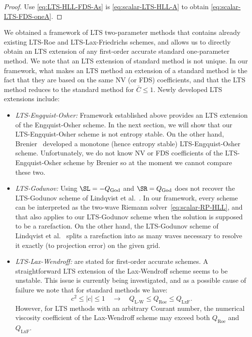 \begin{proof}
Use \eqref{eq:LTS-HLL-FDS-As} is \eqref{eq:scalar-LTS-HLL-A} to obtain \eqref{eq:scalar-LTS-FDS-oneA}.
\end{proof}

We obtained a framework of LTS two-parameter methods that contains already existing LTS-Roe and LTS-Lax-Friedrichs schemes, and allows us to directly obtain an LTS extension of any first-order accurate standard one-parameter method. We note that an LTS extension of standard method is not unique. In our framework, what makes an LTS method an extension of a standard method is the fact that they are based on the same NV (or FDS) coefficients, and that the LTS method reduces to the standard method for $ \bar{C} \leq 1 $. Newly developed LTS extensions include:
\begin{itemize} \label{eq:LTS-1p-itemize}
\item \textit{LTS-Engquist-Osher:} Framework established above provides an LTS extension of the Engquist-Osher scheme. In the next section, we will show that our LTS-Engquist-Osher scheme is not entropy stable. On the other hand, Brenier~\cite{bre84} developed a monotone (hence entropy stable) LTS-Engquist-Osher scheme. Unfortunately, we do not know NV or FDS coefficients of the LTS-Engquist-Osher scheme by Brenier so at the moment we cannot compare these two.

\item \textit{LTS-Godunov:} Using $ \SL=-Q_\text{God} $ and $ \SR=Q_\text{God} $ does not recover the LTS-Godunov scheme of Lindqvist et al.~\cite{lin16}. In our framework, every scheme can be interpreted as the two-wave Riemann solver~\eqref{eq:scalar-RP-HLL}, and that also applies to our LTS-Godunov scheme when the solution is supposed to be a rarefaction. On the other hand, the LTS-Godunov scheme of Lindqvist et al.~\cite{lin16} splits a rarefaction into as many waves necessary to resolve it exactly (to projection error) on the given grid.

\item \textit{LTS-Lax-Wendroff:}  are stated for first-order accurate schemes. A straightforward LTS extension of the Lax-Wendroff scheme seems to be unstable. This issue is currently being investigated, and as a possible cause of failure we note that for standard methods we have:
\begin{equation}
c^2 \leq |c| \leq 1 \quad \rightarrow \quad Q_\text{L-W} \leq Q_\text{Roe} \leq Q_\text{LxF}.
\end{equation}
However, for LTS methods with an arbitrary Courant number, the numerical viscosity coefficient of the Lax-Wendroff scheme may exceed both $ Q_\text{Roe} $ and $ Q_\text{LxF} $.
\end{itemize}

